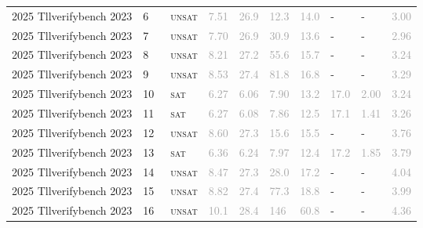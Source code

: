 \begin{center}
{\begin{longtable}{@{}llllllllll@{}}
2025 Tllverifybench 2023 & 6 & ~\textsc{unsat} & \textcolor{darkgray}{7.51} & \textcolor{darkgray}{26.9} & \textcolor{darkgray}{12.3} & \textcolor{darkgray}{14.0} & - & - & \textcolor{darkgray}{3.00} \\
2025 Tllverifybench 2023 & 7 & ~\textsc{unsat} & \textcolor{darkgray}{7.70} & \textcolor{darkgray}{26.9} & \textcolor{darkgray}{30.9} & \textcolor{darkgray}{13.6} & - & - & \textcolor{darkgray}{2.96} \\
2025 Tllverifybench 2023 & 8 & ~\textsc{unsat} & \textcolor{darkgray}{8.21} & \textcolor{darkgray}{27.2} & \textcolor{darkgray}{55.6} & \textcolor{darkgray}{15.7} & - & - & \textcolor{darkgray}{3.24} \\
2025 Tllverifybench 2023 & 9 & ~\textsc{unsat} & \textcolor{darkgray}{8.53} & \textcolor{darkgray}{27.4} & \textcolor{darkgray}{81.8} & \textcolor{darkgray}{16.8} & - & - & \textcolor{darkgray}{3.29} \\
2025 Tllverifybench 2023 & 10 & ~\textsc{sat} & \textcolor{darkgray}{6.27} & \textcolor{darkgray}{6.06} & \textcolor{darkgray}{7.90} & \textcolor{darkgray}{13.2} & \textcolor{darkgray}{17.0} & \textcolor{darkgray}{2.00} & \textcolor{darkgray}{3.24} \\
2025 Tllverifybench 2023 & 11 & ~\textsc{sat} & \textcolor{darkgray}{6.27} & \textcolor{darkgray}{6.08} & \textcolor{darkgray}{7.86} & \textcolor{darkgray}{12.5} & \textcolor{darkgray}{17.1} & \textcolor{darkgray}{1.41} & \textcolor{darkgray}{3.26} \\
2025 Tllverifybench 2023 & 12 & ~\textsc{unsat} & \textcolor{darkgray}{8.60} & \textcolor{darkgray}{27.3} & \textcolor{darkgray}{15.6} & \textcolor{darkgray}{15.5} & - & - & \textcolor{darkgray}{3.76} \\
2025 Tllverifybench 2023 & 13 & ~\textsc{sat} & \textcolor{darkgray}{6.36} & \textcolor{darkgray}{6.24} & \textcolor{darkgray}{7.97} & \textcolor{darkgray}{12.4} & \textcolor{darkgray}{17.2} & \textcolor{darkgray}{1.85} & \textcolor{darkgray}{3.79} \\
2025 Tllverifybench 2023 & 14 & ~\textsc{unsat} & \textcolor{darkgray}{8.47} & \textcolor{darkgray}{27.3} & \textcolor{darkgray}{28.0} & \textcolor{darkgray}{17.2} & - & - & \textcolor{darkgray}{4.04} \\
2025 Tllverifybench 2023 & 15 & ~\textsc{unsat} & \textcolor{darkgray}{8.82} & \textcolor{darkgray}{27.4} & \textcolor{darkgray}{77.3} & \textcolor{darkgray}{18.8} & - & - & \textcolor{darkgray}{3.99} \\
2025 Tllverifybench 2023 & 16 & ~\textsc{unsat} & \textcolor{darkgray}{10.1} & \textcolor{darkgray}{28.4} & \textcolor{darkgray}{146} & \textcolor{darkgray}{60.8} & - & - & \textcolor{darkgray}{4.36} \\

\end{longtable}}
\end{center}
